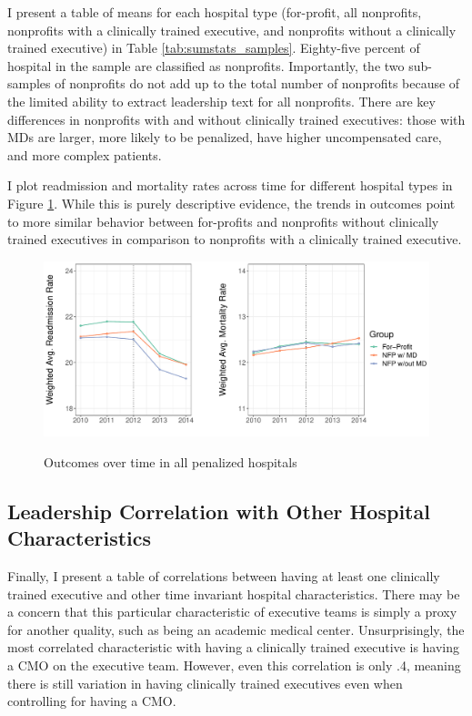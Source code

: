 \documentclass[12pt]{article}
\begin{document}

    I present a table of means for each hospital type (for-profit, all nonprofits, nonprofits with a clinically trained executive, and nonprofits without a clinically trained executive) in Table \ref{tab:sumstats_samples}. Eighty-five percent of hospital in the sample are classified as nonprofits. Importantly, the two sub-samples of nonprofits do not add up to the total number of nonprofits because of the limited ability to extract leadership text for all nonprofits. There are key differences in nonprofits with and without clinically trained executives: those with MDs are larger, more likely to be penalized, have higher uncompensated care, and more complex patients.  


    I plot readmission and mortality rates across time for different hospital types in Figure \ref{fig:weighted_read_mort_graph}. While this is purely descriptive evidence, the trends in outcomes point to more similar behavior between for-profits and nonprofits without clinically trained executives in comparison to nonprofits with a clinically trained executive.

    \begin{figure}[ht!]
    \centering
        \caption{Outcomes over time in all penalized hospitals}
        \includegraphics[width=\textwidth]{Objects/weighted_read_mort_graph.pdf}
        \label{fig:weighted_read_mort_graph}
    \end{figure}

    \subsection{Leadership Correlation with Other Hospital Characteristics}

    Finally, I present a table of correlations between having at least one clinically trained executive and other time invariant hospital characteristics. There may be a concern that this particular characteristic of executive teams is simply a proxy for another quality, such as being an academic medical center. Unsurprisingly, the most correlated characteristic with having a clinically trained executive is having a CMO on the executive team. However, even this correlation is only .4, meaning there is still variation in having clinically trained executives even when controlling for having a CMO. 
\end{document}
